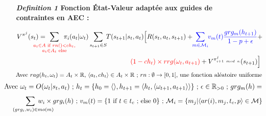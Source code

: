 \documentclass[francais,ROIA,Unicode,manuscript]{cedram}
\begin{document}
\begin{figure*}[h!]
    \label{eq:single_value_function}
    \raggedright
    \textbf{\textit{Definition 1} \quad Fonction État-Valeur adaptée aux guides de contraintes en AEC :}

    \begin{scriptsize}
        \vspace{0.cm}
        \begin{gather*}
            V^{\pi^j}(s_t) = \hspace{-0.75cm}
            \sum_{\textcolor{red}{ \substack{a_{t} \in A \text{ if } rn() < ch_{t}, \\
                        a_{t} \in A_{t} \text{ else}}
                }}{\hspace{-0.7cm} \pi_i(a_{t} | \omega_t)}
            \sum_{s_{t+1} \in S}
            {\hspace{-0.1cm} T(s_{t+1} | s_t, a_{t})
            \Bigl[R(s_t,a_{t},s_{t+1}) + \hspace{-0.1cm}
            \textcolor{blue}{ \sum_{m \in \mathcal{M}_i}{ \hspace{-0.1cm} v_m(t) \frac{grg_m(h_{t+1})}{1 - p + \epsilon} } }
            + } \\
            {\hspace{6cm}\textcolor{red}{(1-ch_t) \times rrg(\omega_t,a_{t+1})} + V^{\pi^j_{i+1 \ mod \ n}}(s_{t+1})\Bigr]}
        \end{gather*}
        \vspace{0.cm}
        \textcolor{red}{\[\text{ \hspace{-0.3cm} Avec } rag(h_t, \omega_t) = A_{t} \times \mathbb{R} \text{, } \langle a_t, ch_{t} \rangle \in A_{t} \times \mathbb{R} \text{ ; } rn: \emptyset \to [0,1[ \text{, une fonction aléatoire uniforme}\]}
        \vspace{-0.2cm}
        \textcolor{blue}{
            \begin{gather*}
                \hspace{-0.65cm}
                \text{Avec } \omega_t = O(\omega_t | s_t, a_t) \text{ ; } h_t = \{h_0 = \langle \rangle, h_{t+1} = \langle h_t, \langle \omega_{t+1}, a_{t+1} \rangle \rangle \} \text{ ; } \epsilon \in \mathbb{R}_{>0} \text{ ; } grg_m(h) =
            \end{gather*}
        }
        \vspace{-0.2cm}
        \textcolor{blue}{
            \begin{gather*}
                \hspace{-0.5cm} \sum_{\hspace{0.3cm}(grg_i,w_i) \in mo(m)}{\hspace{-0.9cm} w_i \times grg_i(h)}
                \text{ ; } v_m(t) = \{ 1 \text{ if } t \in t_c \text{ ; else } 0 \} \text{ ; } \mathcal{M}_i = \{m_j | \langle ar(i),m_j,t_c,p \rangle \in \mathcal{M}\}
            \end{gather*}
        }
        \vspace{0.cm}
    \end{scriptsize}

\end{figure*}
\end{document}
